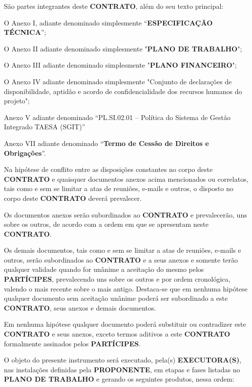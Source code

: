 \xx São partes integrantes deste \textbf{CONTRATO}, além do seu texto principal:

\xxx O Anexo I, adiante denominado simplesmente “\textbf{ESPECIFICAÇÃO TÉCNICA}”;

\xxx O Anexo II adiante denominado simplesmente "\textbf{PLANO DE TRABALHO}";

\xxx O Anexo III adiante denominado simplesmente "\textbf{PLANO FINANCEIRO}";

\xxx O Anexo IV adiante denominado simplesmente "Conjunto de declarações de disponibilidade, aptidão e acordo de confidencialidade dos recursos humanos do projeto";

\xxx Anexo V adiante denominado “PL.SI.02.01 – Política do Sistema de Gestão Integrado TAESA (SGIT)”

\xxx Anexo VII adiante denominado “\textbf{Termo de Cessão de Direitos e Obrigações}”.

\xx Na hipótese de conflito entre as disposições constantes no corpo deste \textbf{CONTRATO} e quaisquer documentos anexos acima mencionados ou correlatos, tais como e sem se limitar a atas de reuniões, e-mails e outros, o disposto no corpo deste \textbf{CONTRATO} deverá prevalecer.

\xxx Os documentos anexos serão subordinados ao \textbf{CONTRATO} e prevalecerão, uns sobre os outros, de acordo com a ordem em que se apresentam neste \textbf{CONTRATO}.

\xxx Os demais documentos, tais como e sem se limitar a atas de reuniões, e-mails e outros, serão subordinados ao \textbf{CONTRATO} e a seus anexos e somente terão qualquer validade quando for unânime a aceitação do mesmo pelos \textbf{PARTÍCIPES}, prevalecendo uns sobre os outros e por ordem cronológica, valendo o mais recente sobre o mais antigo. Destaca-se que em nenhuma hipótese qualquer documento sem aceitação unânime poderá ser subordinado a este \textbf{CONTRATO}, seus anexos e demais documentos.

\xxx Em nenhuma hipótese qualquer documento poderá substituir ou contradizer este \textbf{CONTRATO} e seus anexos, exceto termos aditivos a este \textbf{CONTRATO} formalmente assinados pelos \textbf{PARTÍCIPES}.

\xx O objeto do presente instrumento será executado, pela(s) \textbf{EXECUTORA(S)}, nas instalações definidas pela \textbf{PROPONENTE}, em etapas e fases listadas no \textbf{PLANO DE TRABALHO} e gerando os seguintes produtos, nessa ordem:


